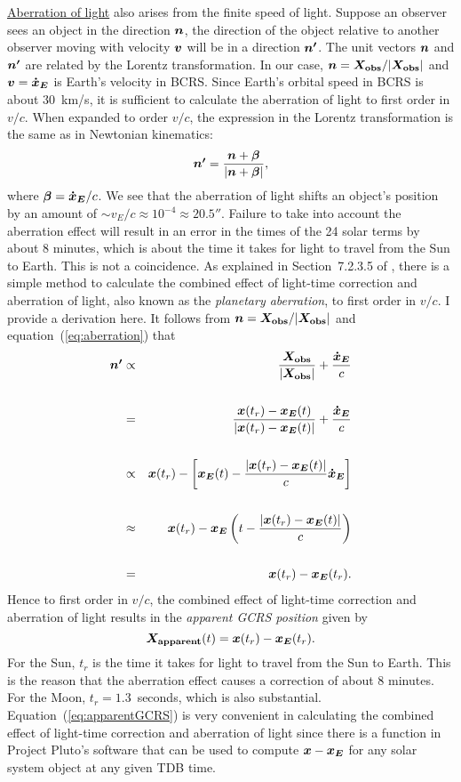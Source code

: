 \documentclass[12pt]{article}
\newcommand \beq {\begin{equation}}
\newcommand \eeq {\end{equation}}
\newcommand \beqn {\begin{eqnarray}}
\newcommand \eeqn {\end{eqnarray}}
\newcommand{\ve}[1]{\mbox{\boldmath $#1$}}
\newcommand{\expl}{\cite{expl}}
\begin{document}
\begin{CJK}{UTF8}{bkai}
\href{https://en.wikipedia.org/wiki/Aberration_of_light}{Aberration of light} 
also arises from the finite speed of light. Suppose an observer
sees an object in the direction $\ve{n}$, the direction of the object
relative to another observer moving with velocity $\ve{v}$ will be in
a direction $\ve{n'}$. The unit vectors $\ve{n}$ and $\ve{n'}$ are related
by the Lorentz transformation. In our case, $\ve{n}=\ve{X_{\rm obs}}/|\ve{X_{\rm obs}}|$ 
and $\ve{v}=\ve{\dot{x}_E}$ is Earth's velocity in BCRS.
Since Earth's orbital speed in BCRS is about 
30~km/s, it is sufficient to calculate the aberration of light to first order 
in $v/c$. When expanded to order $v/c$, the expression in the Lorentz 
transformation is the same as in Newtonian kinematics:
\beq
  \ve{n'} = \frac{\ve{n} + \ve{\beta}}{|\ve{n} + \ve{\beta}|} ,
\label{eq:aberration}
\eeq
where $\ve{\beta} = \ve{\dot{x}_E}/c$. We see that the aberration of light shifts an 
object's position by an amount of $\sim v_E/c \approx 10^{-4}\approx 20.5''$. Failure to take into 
account the aberration effect will result in an error in the times of the 
24 solar terms by about 8 minutes, which is about the time it takes for light 
to travel from the Sun to Earth. This is not a coincidence. As explained in Section~7.2.3.5 
of \expl, there is a simple method to calculate the combined effect of light-time 
correction and aberration of light, also known as the {\em planetary aberration}, to 
first order in $v/c$. I provide a derivation here.  It follows from  
$\ve{n}=\ve{X_{\rm obs}}/|\ve{X_{\rm obs}}|$ and equation~(\ref{eq:aberration}) that 
\beqn
  \ve{n'} &\propto & \frac{\ve{X_{\rm obs}}}{|\ve{X_{\rm obs}}|} + \frac{\ve{\dot{x}_E}}{c} \cr \cr 
 &=& \frac{\ve{x}(t_r) - \ve{x_E}(t)}{|\ve{x}(t_r) - \ve{x_E}(t)|} + 
\frac{\ve{\dot{x}_E}}{c} \cr \cr 
 & \propto & \ve{x}(t_r) - \left[ \ve{x_E}(t) 
- \frac{|\ve{x}(t_r)-\ve{x_E}(t)|}{c} \ve{\dot{x}_E} \right] \cr \cr 
 &\approx & \ve{x}(t_r) - \ve{x_E}\left(t - \frac{|\ve{x}(t_r)-\ve{x_E}(t)|}{c}\right) 
\cr \cr 
 &=& \ve{x}(t_r) - \ve{x_E}(t_r) .
\eeqn
Hence to first order in $v/c$, the combined effect of light-time correction and 
aberration of light results in the {\em apparent GCRS position} given by 
\beq
  \ve{X_{\rm apparent}}(t) = \ve{x}(t_r) - \ve{x_E}(t_r) .
\label{eq:apparentGCRS}
\eeq
For the Sun, $t_r$ is the time it takes for light to travel from the Sun to Earth. 
This is the reason that the aberration effect causes a correction of about 8 minutes. 
For the Moon, $t_r =1.3$~seconds, which is also substantial. Equation~(\ref{eq:apparentGCRS})
is very convenient in calculating the combined effect of light-time correction and 
aberration of light since there is a function in Project Pluto's software that 
can be used to compute $\ve{x}-\ve{x_E}$ for any solar system object at any 
given TDB time.


\end{CJK}
\end{document}
